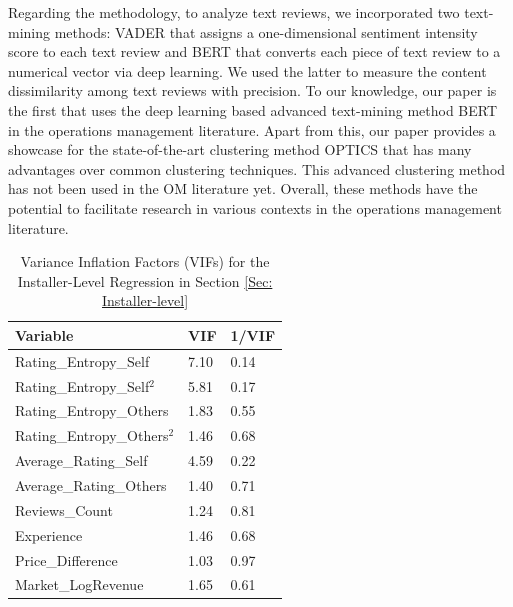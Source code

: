 \documentclass[msom,blindrev]{informs3}
\begin{document}
Regarding the methodology, to analyze text reviews, we incorporated two text-mining methods: VADER that assigns a one-dimensional sentiment intensity score to each text review  and BERT that converts each piece of text review to a numerical vector via deep learning. We used the latter to measure the content dissimilarity among text reviews with precision. To our knowledge, our paper is the first that uses the deep learning based advanced text-mining method BERT in the operations management literature.  Apart from this, our paper provides a showcase for the state-of-the-art clustering method OPTICS that has many advantages over common clustering techniques. This advanced clustering method has not been used in the OM literature yet. Overall, these methods have the potential to facilitate research in various contexts in the operations management literature.
	
	
	
	\newpage

\ECSwitch


\vspace{-10pt}
%

\begin{table}[H]
\centering
\begin{tabular}{@{}lll@{}}
\toprule
Variable                           & VIF  & 1/VIF \\ \midrule
Rating\_Entropy\_Self                & 7.10 & 0.14  \\
Rating\_Entropy\_Self$^2$            & 5.81 & 0.17  \\
Rating\_Entropy\_Others              & 1.83 & 0.55  \\
Rating\_Entropy\_Others$^2$          & 1.46 & 0.68  \\
Average\_Rating\_Self                & 4.59 & 0.22  \\
Average\_Rating\_Others             & 1.40 & 0.71  \\
Reviews\_Count                      & 1.24 & 0.81  \\
Experience                         & 1.46 & 0.68  \\
Price\_Difference                  & 1.03 & 0.97  \\
Market\_LogRevenue                 & 1.65 & 0.61  \\ \bottomrule
\end{tabular}
\caption{Variance Inflation Factors (VIFs) for the Installer-Level Regression in Section \ref{Sec: Installer-level}}
\label{vif_ind}
\end{table}
\end{document}

